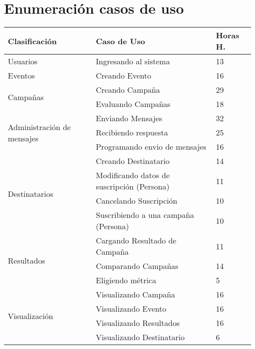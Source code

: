 \documentclass[a4paper, 11pt]{article}
\begin{document}
\newpage
\section{Enumeraci\'on casos de uso}


\begin{table}[H]
\centering
\begin{tabular}{ | p{5cm} | p{8cm} | p{1.5cm} | }
\hline
Clasificación & Caso de Uso & Horas H.\\ \hline \hline
Usuarios & Ingresando al sistema & 13 \\ \hline
Eventos & Creando Evento & 16 \\ \hline
\multirow{2}{5cm}{Campañas} & Creando Campaña & 29 \\ \cline{2-3}
& Evaluando Campañas & 18 \\ \hline
\multirow{3}{5cm}{Administración de mensajes} & Enviando Mensajes & 32 \\ \cline{2-3}
& Recibiendo respuesta & 25 \\ \cline{2-3}
& Programando envio de mensajes & 16 \\ \hline
\multirow{4}{5cm}{Destinatarios} & Creando Destinatario & 14 \\  \cline{2-3}
& Modificando datos de suscripci\'on (Persona) & 11 \\ \cline{2-3}
& Cancelando Suscripci\'on & 10 \\ \cline{2-3}
& Suscribiendo a una campaña (Persona) & 10 \\ \hline
\multirow{3}{5cm}{Resultados} & Cargando Resultado de Campaña & 11 \\ \cline{2-3}
& Comparando Campañas & 14 \\ \cline{2-3}
& Eligiendo métrica & 5 \\ \hline
\multirow{4}{5cm}{Visualización} & Visualizando Campaña & 16 \\ \cline{2-3}
& Visualizando Evento & 16 \\ \cline{2-3}
& Visualizando Resultados & 16 \\ \cline{2-3}
& Visualizando Destinatario & 6 \\ \hline

\end{tabular}
\end{table}
\end{document}
